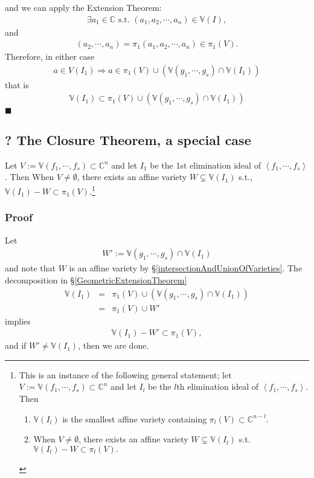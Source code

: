 \documentclass[11pt]{book}
\begin{document}
and we can apply the Extension Theorem:
\begin{eqnarray}
\exists a_1 \in \mathbb{C} \text{ s.t. } (a_1, a_2, \cdots, a_n) \in \mathbb{V}(I),
\end{eqnarray}
and
\begin{eqnarray}
(a_2, \cdots, a_n) = \pi_1(a_1, a_2, \cdots, a_n) \in \pi_1(V).
\end{eqnarray}
Therefore, in either case
\begin{eqnarray}
a \in V(I_1) \Rightarrow a \in \pi_1(V) \cup \left( \mathbb{V}(g_1, \cdots, g_s) \cap \mathbb{V}(I_1) \right) 
\end{eqnarray}
that is
\begin{eqnarray}
\mathbb{V}(I_1) \subset \pi_1(V) \cup \left( \mathbb{V}(g_1, \cdots, g_s) \cap \mathbb{V}(I_1) \right) 
\end{eqnarray}
$\blacksquare$

\subsection{? The Closure Theorem, a special case}
Let $V := \mathbb{V}(f_1, \cdots, f_s) \subset \mathbb{C}^n$ and let $I_1$ be the 1st elimination ideal of $\left< f_1, \cdots, f_s \right>$.
Then
When $V \neq \emptyset$, there exists an affine variety $W \subsetneq \mathbb{V}(I_1)$ s.t., $\mathbb{V}(I_1) - W \subset \pi_1(V).$\footnote{
This is an instance of the following general statement; let $V := \mathbb{V}(f_1, \cdots, f_s) \subset \mathbb{C}^n$ and let $I_l$ be the $l$th elimination ideal of $\left< f_1, \cdots, f_s \right>$.
Then
\begin{enumerate}
\item $\mathbb{V}(I_l)$ is the smallest affine variety containing $\pi_l(V) \subset \mathbb{C}^{n-l}$.

\item When $V \neq \emptyset$, there exists an affine variety $W \subsetneq \mathbb{V}(I_l)$ s.t. $\mathbb{V}(I_l) - W \subset \pi_l(V).$
\end{enumerate}
}

\subsubsection{Proof}
Let 
\begin{eqnarray}
W' := \mathbb{V}(g_1, \cdots, g_s) \cap \mathbb{V}(I_1)
\end{eqnarray}
and note that $W$ is an affine variety by \S\ref{intersectionAndUnionOfVarieties}.
The decomposition in \S\ref{GeometricExtensionTheorem}
\begin{eqnarray}
\mathbb{V}(I_1) &=& \pi_1(V) \cup \left( \mathbb{V}(g_1, \cdots, g_s) \cap \mathbb{V}(I_1) \right)\\
&=& \pi_1(V) \cup W'
\end{eqnarray}
implies 
\begin{eqnarray}
\mathbb{V}(I_1) - W' \subset \pi_1(V),
\end{eqnarray}
and if $W' \neq \mathbb{V}(I_1)$, then we are done.
\end{document}
